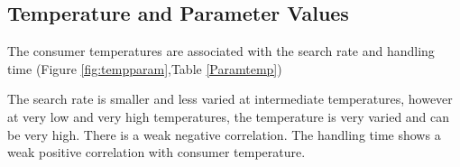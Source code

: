 \documentclass{article}
\begin{document}
\subsection{Temperature and Parameter Values}
The consumer temperatures are associated with the search rate and handling time (Figure \ref{fig:tempparam},Table \ref{Paramtemp}) %

The search rate is smaller and less varied at intermediate temperatures, however at very low and very high temperatures, the temperature is very varied and can be very high. There is a weak negative correlation. The handling time shows a weak positive correlation with consumer temperature.
\begin{figure}[ht]
\centering
{}\\
 \\

\end{figure}
\end{document}
